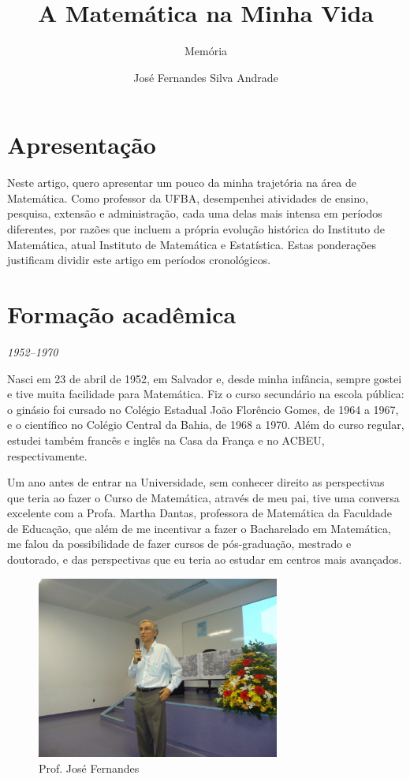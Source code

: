 \documentclass{hipatia}
\subtitle{Memória}
\author{José Fernandes Silva Andrade}
\title{\fontsize{30}{30}\selectfont A Matemática na Minha Vida}
\begin{document}
\setcounter{page}{\memoriapage}
\maketitle


\section{Apresentação}



Neste artigo, quero apresentar um pouco da minha trajetória
na área de Matemática. 
Como professor da UFBA, desempenhei
atividades de ensino, pesquisa, extensão e administração,
cada uma delas mais intensa em períodos diferentes, por
razões que incluem a própria evolução histórica do Instituto
de Matemática, atual Instituto de Matemática e Estatística.
Estas ponderações justificam dividir este artigo em períodos
cronológicos.



\section{Formação acadêmica}



\begin{center}\emph{1952--1970}\end{center}



Nasci em 23 de abril de 1952, em Salvador e, desde minha
infância, sempre gostei e tive muita facilidade para
Matemática. 
Fiz o curso secundário na escola pública: o 
ginásio foi cursado no Colégio Estadual João Florêncio Gomes,
de 1964 a 1967, e o científico no Colégio Central da Bahia,
de 1968 a 1970. Além do curso regular, estudei também
francês e inglês na Casa da França e no ACBEU,
respectivamente. 

Um ano antes de entrar na Universidade, sem conhecer direito
as perspectivas que teria ao fazer o Curso de Matemática,
através de meu pai, tive uma conversa excelente com a Profa.
Martha Dantas, professora de Matemática da Faculdade de
Educação, que além de me incentivar a fazer o Bacharelado em
Matemática, me falou da possibilidade de fazer cursos de
pós-graduação, mestrado e doutorado, e das perspectivas que
eu teria ao estudar em centros mais avançados. 

\begin{figure}[htb!]
\begin{center}
\includegraphics[width=8cm]{ZeFernandes.jpeg}
\end{center}
\caption{Prof. José Fernandes}   
\end{figure}
\end{document}
